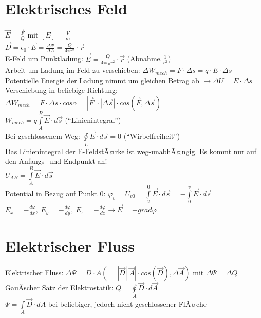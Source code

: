 \documentclass[a4paper,twoside,12pt]{report}
\begin{document}
\section{Elektrisches Feld}

$\vec{E}= \frac{\vec{F}}{Q}$ mit $[E] = \frac{V}{m}$\\
$\vec{D} = \epsilon_0 \cdot \vec{E} = \frac{\Delta\Psi}{\Delta A}= \frac{Q}{4\pi r^2}\cdot \vec{r}$\\
E-Feld um Punktladung: $\vec{E} = \frac{Q}{4\pi\epsilon_0 r^2} \cdot \vec{r}$ (Abnahme $\tilde{} \frac{1}{r^2}$)\\
Arbeit um Ladung im Feld zu verschieben: $\Delta W_{mech} = F\cdot\Delta s = q \cdot E \cdot \Delta s$\\
Potentielle Energie der Ladung nimmt um gleichen Betrag ab $\rightarrow \Delta U = E\cdot \Delta s$\\
Verschiebung in beliebige Richtung: \\
$\Delta W_{mech} = F\cdot \Delta s \cdot cos\alpha = \left|\vec{F}\right| \cdot \left|\Delta\vec{s}\right| \cdot cos (\vec{F}, \Delta\vec{s})$\\
$W_{mech} = q\int\limits_A^B{\vec{E} \cdot d\vec{s}}$ ("`Linienintegral"')\\
Bei geschlossenem Weg: $\oint\limits_ {L}{\vec{E}\cdot d\vec{s}} = 0$ ("`Wirbelfreiheit"')\\
Das Linienintegral der E-FeldstÃ¤rke ist weg-unabhÃ¤ngig. Es kommt nur auf den Anfangs- und Endpunkt an!\\
$U_{AB} = \int\limits_{A}^B{\vec{E} \cdot d\vec{s}} $\\
Potential in Bezug auf Punkt $0$: $\varphi_v = U_{v0} = \int\limits_v^0{\vec{E}\cdot d\vec{s}} = -\int\limits_0^v{\vec{E}\cdot d\vec{s}}$\\
$E_x = -\frac{d\varphi}{dx},\ E_y = -\frac{d\varphi}{dy},\ E_z = -\frac{d\varphi}{dz} \rightarrow \vec{E} = -grad\varphi$\\

\section{Elektrischer Fluss}
Elektrischer Fluss: $\Delta\Psi = D \cdot A ( = \left|\vec{D}\right|\left|\vec{A}\right| \cdot cos(\vec{D}), \Delta\vec{A})$ mit $\Delta \Psi = \Delta Q$\\
GauÃscher Satz der Elektrostatik: $Q = \oint\limits_A{\vec{D} \cdot d\vec{A}}$\\
$\Psi = \int\limits_A{\vec{D} \cdot dA}$ bei beliebiger, jedoch nicht geschlossener FlÃ¤che\\
\end{document}
